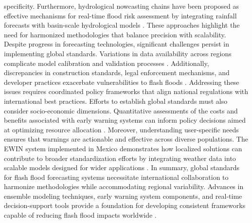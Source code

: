 specificity. Furthermore, hydrological nowcasting chains have been proposed as effective mechanisms for real-time flood risk assessment by integrating rainfall forecasts with basin-scale hydrological models \citep{Silvestro2017}. These approaches highlight the need for harmonized methodologies that balance precision with scalability. Despite progress in forecasting technologies, significant challenges persist in implementing global standards. Variations in data availability across regions complicate model calibration and validation processes \citep{Hinge2024}. Additionally, discrepancies in construction standards, legal enforcement mechanisms, and developer practices exacerbate vulnerabilities to flash floods \citep{Saad2024}. Addressing these issues requires coordinated policy frameworks that align national regulations with international best practices. Efforts to establish global standards must also consider socio-economic dimensions. Quantitative assessments of the costs and benefits associated with early warning systems can inform policy decisions aimed at optimizing resource allocation \citep{Jubach2016}. Moreover, understanding user-specific needs ensures that warnings are actionable and effective across diverse populations. The EWIN system implemented in Mexico demonstrates how localized solutions can contribute to broader standardization efforts by integrating weather data into scalable models designed for wider applications \citep{Msigwa2024}. In summary, global standards for flash flood forecasting systems necessitate international collaboration to harmonize methodologies while accommodating regional variability. Advances in ensemble modeling techniques, early warning system components, and real-time decision-support tools provide a foundation for developing consistent frameworks capable of reducing flash flood impacts worldwide \citep{Flamig2020}\citep{Jubach2016}\citep{Silvestro2017}\citep{Luong2021}.

